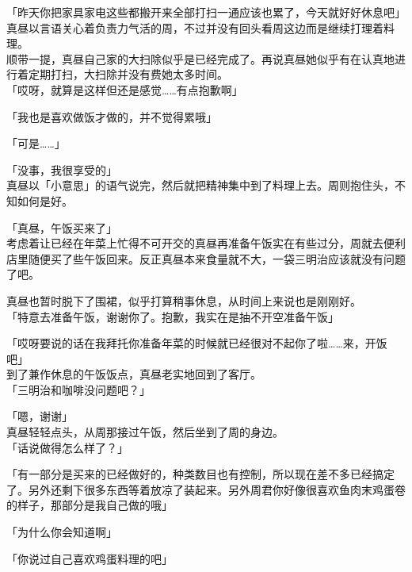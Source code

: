「昨天你把家具家电这些都搬开来全部打扫一通应该也累了，今天就好好休息吧」\\

真昼以言语关心着负责力气活的周，不过并没有回头看周这边而是继续打理着料理。\\

顺带一提，真昼自己家的大扫除似乎是已经完成了。再说真昼她似乎有在认真地进行着定期打扫，大扫除并没有费她太多时间。\\

「哎呀，就算是这样但还是感觉……有点抱歉啊」

「我也是喜欢做饭才做的，并不觉得累哦」

「可是……」

「没事，我很享受的」\\

真昼以「小意思」的语气说完，然后就把精神集中到了料理上去。周则抱住头，不知如何是好。\\

\vspace{2\baselineskip}

「真昼，午饭买来了」\\

考虑着让已经在年菜上忙得不可开交的真昼再准备午饭实在有些过分，周就去便利店里随便买了些午饭回来。反正真昼本来食量就不大，一袋三明治应该就没有问题了吧。

真昼也暂时脱下了围裙，似乎打算稍事休息，从时间上来说也是刚刚好。\\

「特意去准备午饭，谢谢你了。抱歉，我实在是抽不开空准备午饭」

「哎呀要说的话在我拜托你准备年菜的时候就已经很对不起你了啦……来，开饭吧」\\

到了兼作休息的午饭饭点，真昼老实地回到了客厅。\\

「三明治和咖啡没问题吧？」

「嗯，谢谢」\\

真昼轻轻点头，从周那接过午饭，然后坐到了周的身边。\\

「话说做得怎么样了？」

「有一部分是买来的已经做好的，种类数目也有控制，所以现在差不多已经搞定了。另外还剩下很多东西等着放凉了装起来。另外周君你好像很喜欢鱼肉末鸡蛋卷的样子，那部分是我自己做的哦」

「为什么你会知道啊」

「你说过自己喜欢鸡蛋料理的吧」\\

